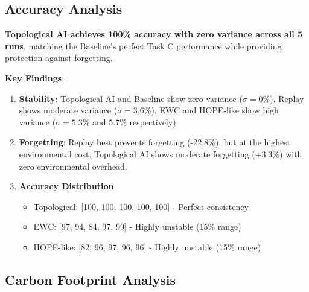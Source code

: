 \documentclass{article}
\begin{document}
\subsection{Accuracy Analysis}

\textbf{Topological AI achieves 100\% accuracy with zero variance across all 5 runs}, matching the Baseline's perfect Task C performance while providing protection against forgetting.

\textbf{Key Findings}:

\begin{enumerate}
\item \textbf{Stability}: Topological AI and Baseline show zero variance ($\sigma=0\%$). Replay shows moderate variance ($\sigma=3.6\%$). EWC and HOPE-like show high variance ($\sigma=5.3\%$ and $5.7\%$ respectively).

\item \textbf{Forgetting}: Replay best prevents forgetting (-22.8\%), but at the highest environmental cost. Topological AI shows moderate forgetting (+3.3\%) with zero environmental overhead.

\item \textbf{Accuracy Distribution}:
   \begin{itemize}
   \item Topological: [100, 100, 100, 100, 100] - Perfect consistency
   \item EWC: [97, 94, 84, 97, 99] - Highly unstable (15\% range)
   \item HOPE-like: [82, 96, 97, 96, 96] - Highly unstable (15\% range)
   \end{itemize}
\end{enumerate}

\subsection{Carbon Footprint Analysis}

\begin{table}[ht]
\centering
\caption{Carbon Footprint Analysis}
\end{table}
\end{document}
